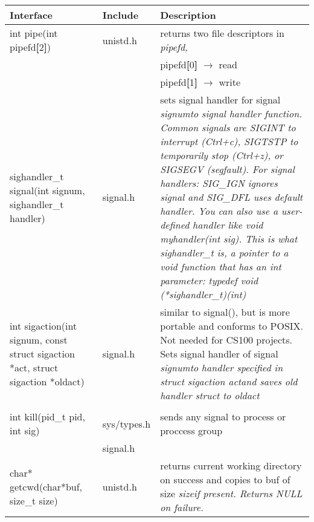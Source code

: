 \documentclass{article}
\begin{document}
\begin{longtabu}{l p{1in} p{4in}}
    \\ \pagebreak
    \bf Interface & \bf Include & \bf Description
    \\ \hline
    int pipe(int pipefd\textbf{[}2\textbf{]}) & unistd.h & returns two file descriptors in \it pipefd\rm,
    \\
    & & pipefd\textbf{[}0\textbf{]} $\rightarrow$ read
    \\
    & & pipefd\textbf{[}1\textbf{]} $\rightarrow$ write
    \\ \hline
    sighandler_t signal(int signum, sighandler_t handler) & signal.h & sets signal handler for signal \it signum\rm to signal handler function. Common signals are SIGINT to interrupt (Ctrl+c), SIGTSTP to temporarily stop (Ctrl+z), or SIGSEGV (segfault). For signal handlers: SIG_IGN ignores signal and SIG_DFL uses default handler. You can also use a user-defined handler like void myhandler(int sig). This is what sighandler_t is, a pointer to a void function that has an int parameter: typedef void (*sighandler_t)(int)
    \\ \hline
    int sigaction(int signum, const struct sigaction *act, struct sigaction *oldact) & signal.h & similar to signal(), but is more portable and conforms to POSIX. Not needed for CS100 projects. Sets signal handler of signal \it signum\rm to handler specified in struct sigaction \it act\rm and saves old handler struct to \it oldact\rm 
    \\
    \\ \hline
    int kill(pid\_t pid, int sig) & sys/types.h & sends any signal to process or proccess group
    \\
    & signal.h & 
    \\ \hline
    char* getcwd(char*buf, size\_t size)& unistd.h & returns current working directory on success and copies to buf of size \it size\rm if present. Returns NULL on failure.

\end{longtabu}
\end{document}
